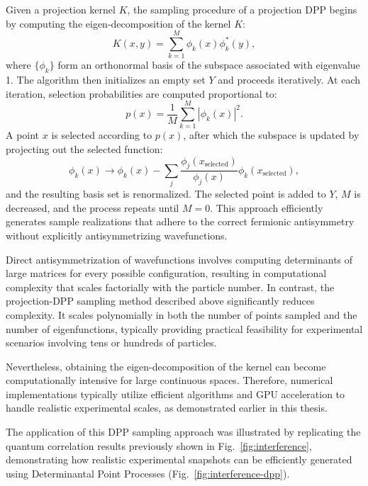
Given a projection kernel $K$, the sampling procedure of a projection DPP begins by computing the eigen-decomposition of the kernel $K$:
\begin{equation}
K(x,y) = \sum_{k=1}^{M} \phi_k(x)\phi_k^*(y),
\end{equation}
where $\{\phi_k\}$ form an orthonormal basis of the subspace associated with eigenvalue 1.
The algorithm then initializes an empty set $Y$ and proceeds iteratively. At each iteration, selection probabilities are computed proportional to:
\begin{equation}
p(x) = \frac{1}{M} \sum_{k=1}^{M} |\phi_k(x)|^2.
\end{equation}
A point $x$ is selected according to $p(x)$, after which the subspace is updated by projecting out the selected function:
\begin{equation}
\phi_k(x) \rightarrow \phi_k(x) - \sum_j \frac{\phi_j(x_{\text{selected}})}{\phi_j(x)} \phi_k(x_{\text{selected}}),
\end{equation}
and the resulting basis set is renormalized. The selected point is added to $Y$, $M$ is decreased, and the process repeats until $M = 0$. This approach efficiently generates sample realizations that adhere to the correct fermionic antisymmetry without explicitly antisymmetrizing wavefunctions.


Direct antisymmetrization of wavefunctions involves computing determinants of large matrices for every possible configuration, resulting in computational complexity that scales factorially with the particle number. In contrast, the projection-DPP sampling method described above significantly reduces complexity. It scales polynomially in both the number of points sampled and the number of eigenfunctions, typically providing practical feasibility for experimental scenarios involving tens or hundreds of particles.

Nevertheless, obtaining the eigen-decomposition of the kernel can become computationally intensive for large continuous spaces. Therefore, numerical implementations typically utilize efficient algorithms and GPU acceleration to handle realistic experimental scales, as demonstrated earlier in this thesis.

The application of this DPP sampling approach was illustrated by replicating the quantum correlation results previously shown in Fig.~\ref{fig:interference}, demonstrating how realistic experimental snapshots can be efficiently generated using Determinantal Point Processes (Fig.~\ref{fig:interference-dpp}).
